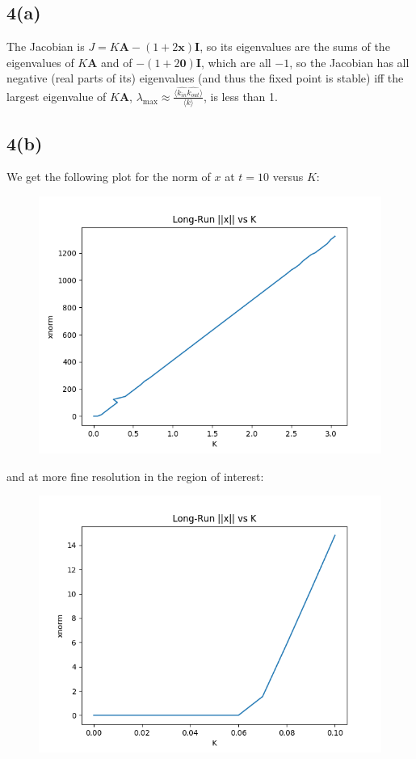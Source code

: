 \documentclass[11pt]{article}
\begin{document}
\subsection*{4(a)} The Jacobian is $J = K\bm{A} - (1+2\bm{x})\bm{I}$, so its eigenvalues are the sums of the eigenvalues of $K\bm{A}$ and of $-(1+2\bm{0})\bm{I}$, which are all $-1$, so the Jacobian has all negative (real parts of its) eigenvalues (and thus the fixed point is stable) iff the largest eigenvalue of $K\bm{A}$, $\lambda_{\text{max}} \approx  \frac{\langle\hat{k_{in}}\hat{k_{out}}\rangle}{\langle k \rangle}$, is less than 1.
\subsection*{4(b)} We get the following plot for the norm of $x$ at $t=10$ versus $K$:\\
\begin{figure}[H]
	\includegraphics[scale=0.7]{HW/hw3p4res}
	\label{fig:hw3p4res}
\end{figure}
and at more fine resolution in the region of interest:\\
\begin{figure}[H]
	\includegraphics[scale=0.7]{HW/hw3p4resfine}
	\label{fig:hw3p4resfine}
\end{figure}
\end{document}
